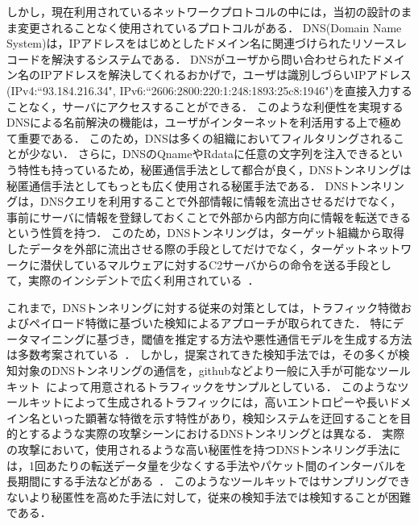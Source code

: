 しかし，現在利用されているネットワークプロトコルの中には，当初の設計のまま変更されることなく使用されているプロトコルがある．
DNS(Domain Name System)は，IPアドレスをはじめとしたドメイン名に関連づけられたリソースレコードを解決するシステムである．
DNSがユーザから問い合わせられたドメイン名のIPアドレスを解決してくれるおかげで，ユーザは識別しづらいIPアドレス(IPv4:``93.184.216.34", IPv6:``2606:2800:220:1:248:1893:25c8:1946")を直接入力することなく，サーバにアクセスすることができる．
このような利便性を実現するDNSによる名前解決の機能は，ユーザがインターネットを利活用する上で極めて重要である．
このため，DNSは多くの組織においてフィルタリングされることが少ない．
さらに，DNSのQnameやRdataに任意の文字列を注入できるという特性も持っているため，秘匿通信手法として都合が良く，DNSトンネリングは秘匿通信手法としてもっとも広く使用される秘匿手法である．
DNSトンネリングは，DNSクエリを利用することで外部情報に情報を流出させるだけでなく，事前にサーバに情報を登録しておくことで外部から内部方向に情報を転送できるという性質を持つ．
このため，DNSトンネリングは，ターゲット組織から取得したデータを外部に流出させる際の手段としてだけでなく，ターゲットネットワークに潜伏しているマルウェアに対するC2サーバからの命令を送る手段として，実際のインシデントで広く利用されている~\cite{frameworkpos, bondupdater, bernhardpos, multigrainpos, pisloader, denis, dnsmessenger, udpos}．

これまで，DNSトンネリングに対する従来の対策としては，トラフィック特徴およびペイロード特徴に基づいた検知によるアプローチが取られてきた．
特にデータマイニングに基づき，閾値を推定する方法や悪性通信モデルを生成する方法は多数考案されている~\cite{born, cheng, liu, asaf, steadman, jawad}．
しかし，提案されてきた検知手法では，その多くが検知対象のDNSトンネリングの通信を，githubなどより一般に入手が可能なツールキット~\cite{ozymandns, iodine, dnscat2}によって用意されるトラフィックをサンプルとしている．
このようなツールキットによって生成されるトラフィックには，高いエントロピーや長いドメイン名といった顕著な特徴を示す特性があり，検知システムを迂回することを目的とするような実際の攻撃シーンにおけるDNSトンネリングとは異なる．
実際の攻撃において，使用されるような高い秘匿性を持つDNSトンネリング手法には，1回あたりの転送データ量を少なくする手法やパケット間のインターバルを長期間にする手法などがある~\cite{asaf}．
このようなツールキットではサンプリングできないより秘匿性を高めた手法に対して，従来の検知手法では検知することが困難である．

